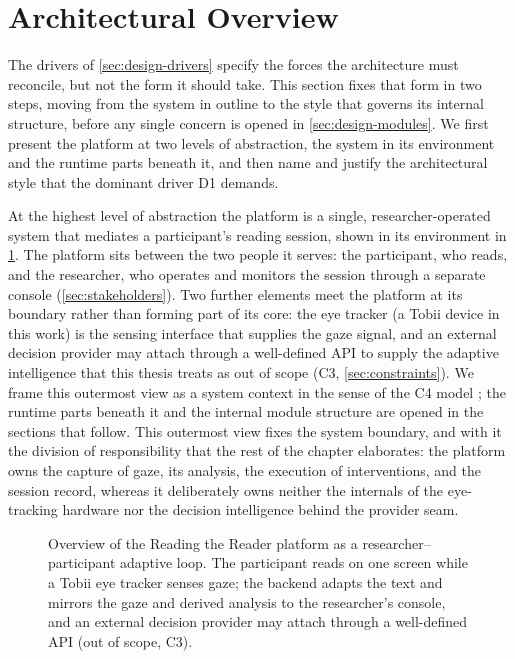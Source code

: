 \section{Architectural Overview}
\label{sec:design-style}

The drivers of \cref{sec:design-drivers} specify the forces the architecture must reconcile, but not the form it should take.
This section fixes that form in two steps, moving from the system in outline to the style that governs its internal structure, before any single concern is opened in \cref{sec:design-modules}.
We first present the platform at two levels of abstraction, the system in its environment and the runtime parts beneath it, and then name and justify the architectural style that the dominant driver D1 demands.

At the highest level of abstraction the platform is a single, researcher-operated system that mediates a participant's reading session, shown in its environment in \cref{fig:design-context}.
The platform sits between the two people it serves: the participant, who reads, and the researcher, who operates and monitors the session through a separate console (\cref{sec:stakeholders}).
Two further elements meet the platform at its boundary rather than forming part of its core: the eye tracker (a Tobii device in this work) is the sensing interface that supplies the gaze signal, and an external decision provider may attach through a well-defined API to supply the adaptive intelligence that this thesis treats as out of scope (C3, \cref{sec:constraints}).
We frame this outermost view as a system context in the sense of the C4 model \cite{c4model}; the runtime parts beneath it and the internal module structure are opened in the sections that follow.
This outermost view fixes the system boundary, and with it the division of responsibility that the rest of the chapter elaborates: the platform owns the capture of gaze, its analysis, the execution of interventions, and the session record, whereas it deliberately owns neither the internals of the eye-tracking hardware nor the decision intelligence behind the provider seam.

\begin{figure}[htbp]
\centering

\caption[Overview of the Reading the Reader platform.]{Overview of the Reading the Reader platform as a researcher--participant adaptive loop. The participant reads on one screen while a Tobii eye tracker senses gaze; the backend adapts the text and mirrors the gaze and derived analysis to the researcher's console, and an external decision provider may attach through a well-defined API (out of scope, C3).}
\label{fig:design-context}
\end{figure}

